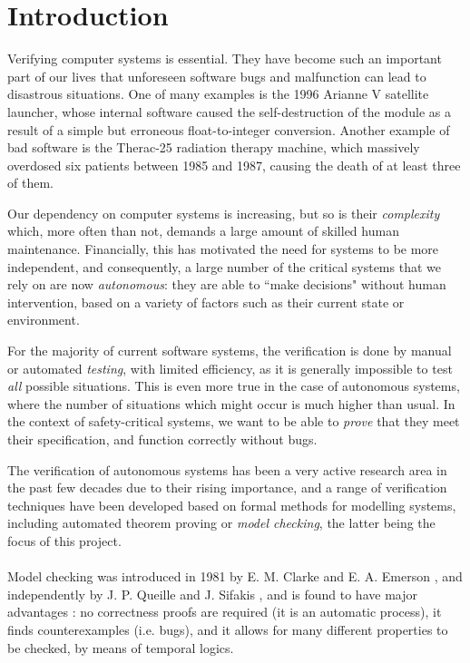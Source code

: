 \documentclass[11pt]{report}
\begin{document}
\tableofcontents
\clearpage
\begin{abstract}

\end{abstract}

\chapter{Introduction}

Verifying computer systems is essential. They have become such an important part of our lives that unforeseen software bugs and malfunction can lead to disastrous situations. One of many examples is the 1996 Arianne \textrm{V} satellite launcher, whose internal software caused the self-destruction of the module as a result of a simple but erroneous float-to-integer conversion. Another example of bad software is the Therac-25 radiation therapy machine, which massively overdosed six patients between 1985 and 1987, causing the death of at least three of them. 

Our dependency on computer systems is increasing, but so is their \textit{complexity} which, more often than not, demands a large amount of skilled human maintenance. Financially, this has motivated the need for systems to be more independent, and consequently, a large number of the critical systems that we rely on are now \textit{autonomous}: they are able to ``make decisions" without human intervention, based on a variety of factors such as their current state or environment. 

For the majority of current software systems, the verification is done by manual or automated \textit{testing}, with limited efficiency, as it is generally impossible to test \textit{all} possible situations. This is even more true in the case of autonomous systems, where the number of situations which might occur is much higher than usual. In the context of safety-critical systems, we want to be able to \textit{prove} that they meet their specification, and function correctly without bugs.

The verification of autonomous systems has been a very active research area in the past few decades due to their rising importance, and a range of verification techniques have been developed based on formal methods for modelling systems, including automated theorem proving or \textit{model checking}, the latter being the focus of this project.
\\\\
 Model checking was introduced in 1981 by E. M. Clarke and E. A. Emerson \cite{original_model_checking}, and independently by J. P. Queille and J. Sifakis \cite{symbolic_model_checking}, and is found to have major advantages \cite{birth_of_model_checking}: no correctness proofs are required (it is an automatic process), it finds counterexamples (i.e. bugs), and it allows for many different properties to be checked, by means of temporal logics. 
 
\end{document}
